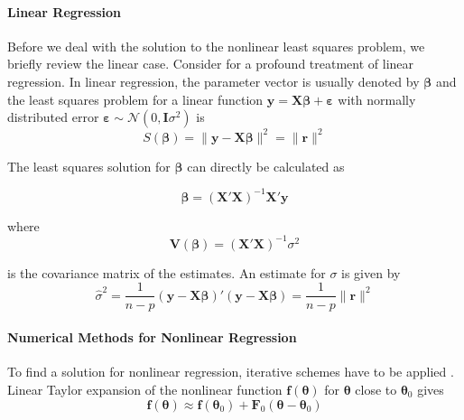 \paragraph{Linear Regression\\}
Before we deal with the solution to the nonlinear least squares problem, we briefly review the linear case. Consider \citet[chap. 5]{Draper} for a profound treatment of linear regression.
In linear regression, the parameter vector is usually denoted by $\boldsymbol{\beta}$ and the least squares problem for a linear function 
$\mathbf{y} = \mathbf{X} \boldsymbol{\beta} + \boldsymbol{\varepsilon}$ 
with normally distributed error 
$\boldsymbol{\varepsilon} \sim \mathcal{N}(0,\mathbf{I} \sigma^2)$ 
is
\begin{equation}
S(\boldsymbol{\beta}) = \| \mathbf{y} - \mathbf{X}\boldsymbol{\beta} \|^2 = \| \mathbf{r} \|^2
\end{equation}

The least squares solution for $\boldsymbol{\beta}$ can directly be calculated as

\begin{equation}
\label{eq:linear_ls_solution}
\boldsymbol{\beta} = (\mathbf{X}' \mathbf{X})^{-1} \mathbf{X}' \mathbf{y}
\end{equation}

where
\begin{equation}
\label{eq:linear_ls_covariance}
\mathbf{V} (\boldsymbol{\beta}) = (\mathbf{X}' \mathbf{X})^{-1} {\sigma}^2
\end{equation}

is the covariance matrix of the estimates. An estimate for ${\sigma}$ is given by
\begin{equation}
\hat{\sigma}^2
= \frac{1}{n-p} (\mathbf{y} - \mathbf{X} \boldsymbol{\beta})' (\mathbf{y} - \mathbf{X} \boldsymbol{\beta})
= \frac{1}{n-p} \| \mathbf{r} \|^2
\end{equation}

\paragraph{Numerical Methods for Nonlinear Regression\\}
To find a solution for nonlinear regression, iterative schemes have to be applied \citep{Seber}.
Linear Taylor expansion of the nonlinear function
$\mathbf{f}(\boldsymbol{\theta})$ 
for 
$\boldsymbol{\theta}$
close to 
$\boldsymbol{\theta}_0$
gives
\begin{equation}
\label{eq:linearized_f}
\mathbf{f}(\boldsymbol{\theta}) \approx
\mathbf{f}(\boldsymbol{\theta}_0) + \mathbf{F}_0(\boldsymbol{\theta} - \boldsymbol{\theta}_0)
\end{equation}

